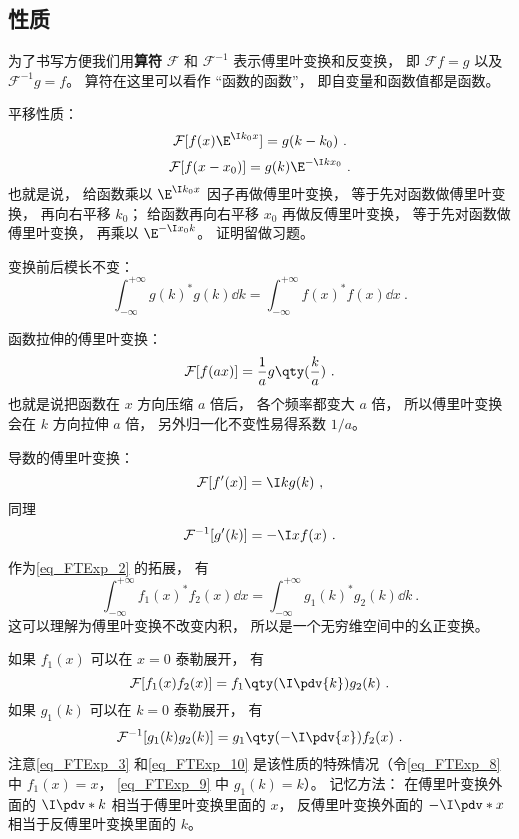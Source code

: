 \subsection{性质}
为了书写方便我们用\textbf{算符} $\mathcal F$ 和 $\mathcal F^{-1}$ 表示傅里叶变换和反变换， 即 $\mathcal F f = g$ 以及 $\mathcal F^{-1} g = f$。 算符在这里可以看作 “函数的函数”， 即自变量和函数值都是函数。

平移性质：
\begin{equation}\label{eq_FTExp_4}
\mathcal F [f(x) \E^{\I k_0 x}] = g(k - k_0)~.
\end{equation}
\begin{equation}\label{eq_FTExp_7}
\mathcal F[f(x - x_0)] = g(k) \E^{-\I k x_0}~.
\end{equation}
也就是说， 给函数乘以 $\E^{\I k_0 x}$ 因子再做傅里叶变换， 等于先对函数做傅里叶变换， 再向右平移 $k_0$； 给函数再向右平移 $x_0$ 再做反傅里叶变换， 等于先对函数做傅里叶变换， 再乘以 $\E^{-\I x_0 k}$。 证明留做习题。

变换前后模长不变：
\begin{equation}\label{eq_FTExp_2}
\int_{-\infty}^{+\infty} g(k)^* g(k) \dd{k} = \int_{-\infty}^{+\infty} f(x)^* f(x) \dd{x}~.
\end{equation}

函数拉伸的傅里叶变换：
\begin{equation}
\mathcal F[f(ax)] = \frac{1}{a} g\qty(\frac{k}{a})~.
\end{equation}
也就是说把函数在 $x$ 方向压缩 $a$ 倍后， 各个频率都变大 $a$ 倍， 所以傅里叶变换会在 $k$ 方向拉伸 $a$ 倍， 另外归一化不变性易得系数 $1/a$。

导数的傅里叶变换：
\begin{equation}\label{eq_FTExp_3}
\mathcal F [f'(x)] = \I k g(k)~,
\end{equation}
同理
\begin{equation}\label{eq_FTExp_10}
\mathcal F^{-1} [g'(k)] = -\I x f(x)~.
\end{equation}

作为\autoref{eq_FTExp_2} 的拓展， 有
\begin{equation}
\int_{-\infty}^{+\infty} f_1(x)^* f_2(x) \dd{x} = \int_{-\infty}^{+\infty} g_1(k)^* g_2(k) \dd{k}~.
\end{equation}
这可以理解为傅里叶变换不改变内积， 所以是一个无穷维空间中的幺正变换。

如果 $f_1(x)$ 可以在 $x = 0$ 泰勒展开， 有
\begin{equation}\label{eq_FTExp_8}
\mathcal{F}[f_1(x) f_2(x)] = f_1\qty(\I \pdv{k}) g_2(k)~.
\end{equation}
如果 $g_1(k)$ 可以在 $k = 0$ 泰勒展开， 有
\begin{equation}\label{eq_FTExp_9}
\mathcal{F}^{-1}[g_1(k) g_2(k)] = g_1\qty(-\I \pdv{x}) f_2(x)~.
\end{equation}
注意\autoref{eq_FTExp_3} 和\autoref{eq_FTExp_10} 是该性质的特殊情况（令\autoref{eq_FTExp_8} 中 $f_1(x) = x$， \autoref{eq_FTExp_9} 中 $g_1(k) = k$）。 记忆方法： 在傅里叶变换外面的 $\I\pdv*{k}$ 相当于傅里叶变换里面的 $x$， 反傅里叶变换外面的 $-\I\pdv*{x}$ 相当于反傅里叶变换里面的 $k$。


